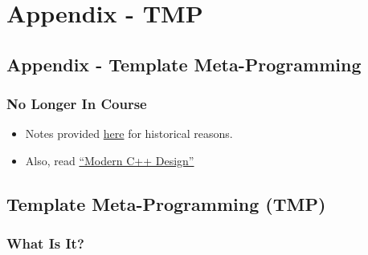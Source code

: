 \section{Appendix - TMP}\label{appendix---tmp}

\subsection{Appendix - Template
Meta-Programming}\label{appendix---template-meta-programming}

\subsubsection{No Longer In Course}\label{no-longer-in-course}

\begin{itemize}
\itemsep1pt\parskip0pt
\item
  Notes provided \href{sec01TemplateMeta}{here} for historical reasons.
\item
  Also, read
  \href{http://erdani.com/index.php/books/modern-c-design/}{``Modern C++
  Design''}
\end{itemize}

\subsection{Template Meta-Programming
(TMP)}\label{template-meta-programming-tmp}

\subsubsection{What Is It?}\label{what-is-it-1}

